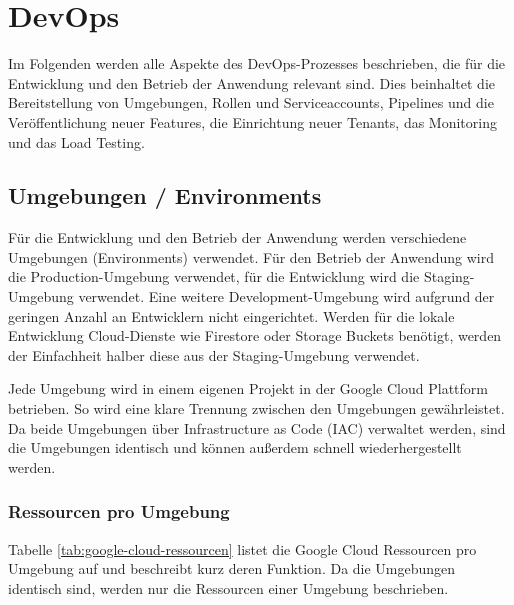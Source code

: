 \section{DevOps}

Im Folgenden werden alle Aspekte des DevOps-Prozesses beschrieben, 
die für die Entwicklung und den Betrieb der Anwendung relevant sind. 
Dies beinhaltet die Bereitstellung von Umgebungen, Rollen und Serviceaccounts, 
Pipelines und die Veröffentlichung neuer Features, die Einrichtung neuer Tenants, 
das Monitoring und das Load Testing.

\subsection{Umgebungen / Environments}

Für die Entwicklung und den Betrieb der Anwendung werden verschiedene Umgebungen (Environments) verwendet.
Für den Betrieb der Anwendung wird die \glqq{}Production\grqq{}-Umgebung verwendet, für 
die Entwicklung wird die \glqq{}Staging\grqq{}-Umgebung verwendet. 
Eine weitere \glqq{}Development\grqq{}-Umgebung wird aufgrund der geringen Anzahl an Entwicklern 
nicht eingerichtet. Werden für die lokale Entwicklung Cloud-Dienste wie Firestore oder 
Storage Buckets benötigt, werden der Einfachheit halber diese aus der \glqq{}Staging\grqq{}-Umgebung 
verwendet.

Jede Umgebung wird in einem eigenen Projekt in der Google Cloud Plattform betrieben.
So wird eine klare Trennung zwischen den Umgebungen gewährleistet.
Da beide Umgebungen über Infrastructure as Code (IAC) verwaltet werden,
sind die Umgebungen identisch und können außerdem schnell wiederhergestellt werden.

\subsubsection{Ressourcen pro Umgebung}

Tabelle \ref{tab:google-cloud-ressourcen} listet die Google Cloud Ressourcen pro Umgebung auf und
beschreibt kurz deren Funktion. Da die Umgebungen identisch sind, werden nur die Ressourcen einer 
Umgebung beschrieben.

